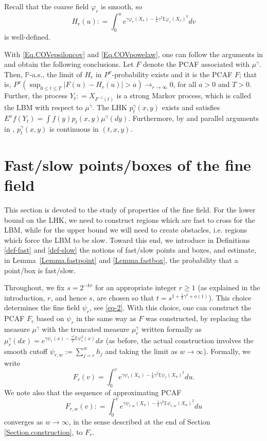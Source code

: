\documentclass[11pt]{article}
\theoremstyle{definition}
\def \E {{\mathbb{E}}}
\def \P {{\mathbb{P}}}
\def \T {{\mathbb{T}}}
\begin{document}
Recall that the coarse field $\varphi_r$ is smooth, so
 $$
H_r (u) : = \int_0^u e^{\gamma \varphi_r (X_v) - \frac 1 2 \gamma^2 \E \varphi_r (X_v)^2} d v
 $$
is well-defined.

With \eqref{Eq.COVepsiloncov} and \eqref{Eq.COVpowelaw},
one can follow the arguments in \cite[Section 2]{GRV13}
and obtain the following conclusions.
Let $F$ denote the PCAF associated with $\mu^\gamma$. Then,
$\P$-a.s., the limit of $H_r$ in $P^x$-probability exists
and it is the PCAF $F$; that is,
$P^x(\sup_{0 \le t \le T} |F(u) - H_r (u) |> a ) \to_{r\to\infty} 0$, for all $a > 0$ and $T > 0$. Further,
the process
$Y_t : = X_{F^{-1} (t)}$ is a strong Markov process, which
is called the LBM with respect to $\mu^\gamma$.
The LHK $p^\gamma_t (x,y)$ exists and satisfies $E^x f(Y_t) =
\int f (y)  p_t (x,y)  \mu^\gamma (d y)$. Furthermore, by \cite[Theorem 0.1]{GRV14}
and parallel arguments in \cite{MRVZ14},
$p^\gamma_t (x,y)$ is continuous in $(t,x,y)$.




\section{Fast/slow points/boxes of the fine field} \label{Section.finefield}

This section is devoted to the study of
properties  of the fine field.
For the lower bound on the LHK, we need to construct regions which are fast
to cross for the LBM,
while for the upper bound we will need to create obstacles, i.e.
regions which force the LBM to be slow. Toward this end,
we introduce in Definitions
\ref{def-fast} and \ref{def-slow}
the notions of fast/slow points and boxes, and
estimate,
in Lemma~\ref{Lemma.fastpoint} and \ref{Lemma.fastbox},
the probability that a point/box is fast/slow.

Throughout, we fix $s=2^{-kr}$ for an appropriate integer $r \ge 1$ (as
explained in the introduction, $r$, and hence $s$, are chosen so that
$t=s^{1+\frac12 \gamma^2+o(1)}$). This choice determines the
fine field $\psi_r$, see \eqref{eq-2}.
With this choice, one can construct the PCAF $F_r$ based on $\psi_r$
in the same way as $F$ was constructed, by replacing the measure $\mu^\gamma$ with the
truncated measure $\mu_r^\gamma$ written formally as $\mu_r^\gamma(dx)=
e^{\gamma \psi_r(x)-\frac{\gamma^2}{2} \E \psi_r^2(x)} dx$
(as before, the actual construction involves  the smooth cutoff
$\psi_{r,w}:=
  \sum_{j=r}^w h_j$ and taking the limit as $w\to\infty$). Formally,
  we write
  \begin{equation}
    \label{eq-11a} F_r (v) = \int_0^v
    e^{\gamma \psi_r  (X_u) - \frac 1 2 \gamma^2 \E \psi_r  (X_u)^2 } d u .
  \end{equation}
  We note also that the
  sequence of approximating PCAF
  $$F_{r,w}(v)
  : = \int_0^v e^{\gamma \psi_{r,w} (X_u) -
  \frac 1 2 \gamma^2 \E \psi_{r,w} (X_u)^2} d u
 $$
 converges as $w\to\infty$,
 in the sense described at the end of Section \ref{Section.construction}, to $F_r$.
\end{document}
